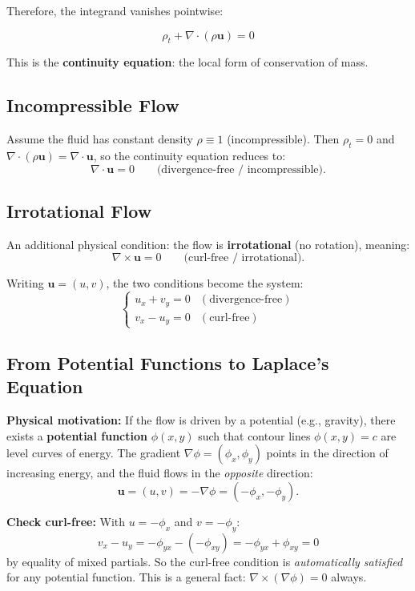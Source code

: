 \documentclass[11pt]{report}
\begin{document}
Therefore, the integrand vanishes pointwise:

\begin{theorem}
\[
\boxed{\rho_t + \nabla \cdot (\rho \mathbf{u}) = 0}
\]
\end{theorem}

This is the \textbf{continuity equation}: the local form of conservation of mass.

\subsection*{Incompressible Flow}

Assume the fluid has constant density $\rho \equiv 1$ (incompressible). Then $\rho_t = 0$ and $\nabla \cdot (\rho \mathbf{u}) = \nabla \cdot \mathbf{u}$, so the continuity equation reduces to:
\[
\nabla \cdot \mathbf{u} = 0 \qquad \text{(divergence-free / incompressible)}.
\]

\subsection*{Irrotational Flow}

An additional physical condition: the flow is \textbf{irrotational} (no rotation), meaning:
\[
\nabla \times \mathbf{u} = 0 \qquad \text{(curl-free / irrotational)}.
\]

Writing $\mathbf{u} = (u, v)$, the two conditions become the system:
\[
\begin{cases} u_x + v_y = 0 & (\text{divergence-free}) \\ v_x - u_y = 0 & (\text{curl-free}) \end{cases}
\]

\subsection*{From Potential Functions to Laplace's Equation}

\textbf{Physical motivation:} If the flow is driven by a potential (e.g., gravity), there exists a \textbf{potential function} $\phi(x,y)$ such that contour lines $\phi(x,y) = c$ are level curves of energy. The gradient $\nabla \phi = (\phi_x, \phi_y)$ points in the direction of increasing energy, and the fluid flows in the \textit{opposite} direction:
\[
\mathbf{u} = (u, v) = -\nabla \phi = (-\phi_x, -\phi_y).
\]

\textbf{Check curl-free:} With $u = -\phi_x$ and $v = -\phi_y$:
\[
v_x - u_y = -\phi_{yx} - (-\phi_{xy}) = -\phi_{yx} + \phi_{xy} = 0
\]
by equality of mixed partials. So the curl-free condition is \textit{automatically satisfied} for any potential function. This is a general fact: $\nabla \times (\nabla \phi) = 0$ always.
\end{document}
